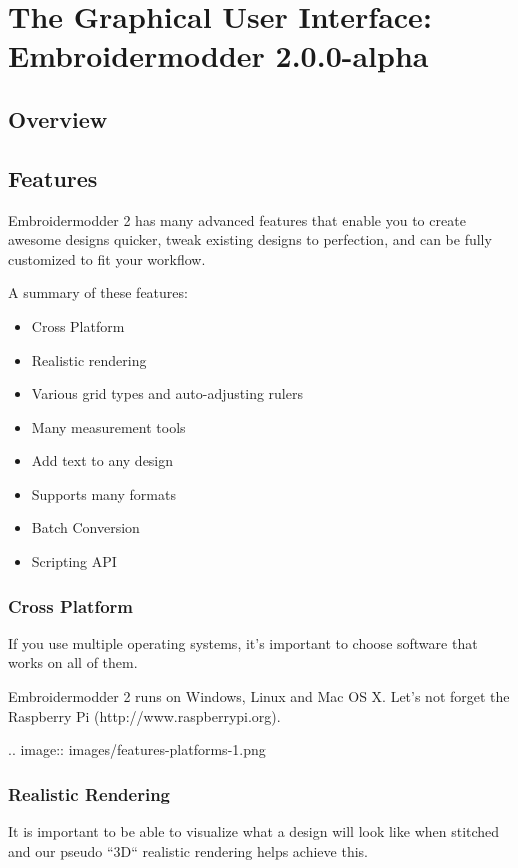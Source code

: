 \documentclass[10pt]{report}
\begin{document}
\chapter{The Graphical User Interface: Embroidermodder 2.0.0-alpha}

\section{Overview}

\section{Features}

Embroidermodder 2 has many advanced features that enable you to create awesome designs quicker, tweak existing designs to perfection, and can be fully customized to fit your workflow.

A summary of these features:

\begin{itemize}
\item Cross Platform
\item Realistic rendering
\item Various grid types and auto-adjusting rulers
\item Many measurement tools
\item Add text to any design
\item Supports many formats
\item Batch Conversion
\item Scripting API
\end{itemize}

\subsection{Cross Platform}

If you use multiple operating systems, it's important to choose software that works on all of them.

Embroidermodder 2 runs on Windows, Linux and Mac OS X. Let's not forget the Raspberry Pi (http://www.raspberrypi.org).

.. image::
   images/features-platforms-1.png

\subsection{Realistic Rendering}

It is important to be able to visualize what a design will look like when stitched and our pseudo ``3D`` realistic rendering helps achieve this.
\end{document}
